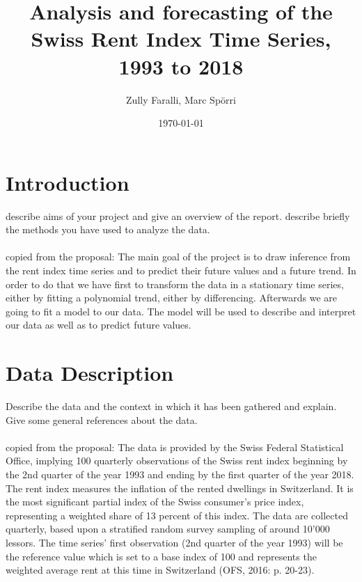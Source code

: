\documentclass[11pt,a4paper]{article}
\author{Zully Faralli, Marc Spörri} \title{Analysis and forecasting of the Swiss Rent Index Time Series, 1993 to 2018} \date{\today}
\begin{document}
\maketitle


\section{Introduction}
describe aims of your project and give an overview of the report. describe briefly the methods you have used to analyze the data.
\\
\\
copied from the proposal: The main goal of the project is to draw inference from the rent index time series and to predict their
future values and a future trend. In order to do that we have first to transform the data in a
stationary time series, either by fitting a polynomial trend, either by differencing. Afterwards we are
going to fit a model to our data. The model will be used to describe and interpret our data as well as
to predict future values.

\section{Data Description}
Describe the data and the context in which it has been gathered and explain. Give some general references about the data.
\\
\\
copied from the proposal: The data is provided by the Swiss Federal Statistical Office, implying 100 quarterly observations of
the Swiss rent index beginning by the 2nd quarter of the year 1993 and ending by the first quarter of
the year 2018. The rent index measures the inflation of the rented dwellings in Switzerland. It is the
most significant partial index of the Swiss consumer’s price index, representing a weighted share of
13 percent of this index. The data are collected quarterly, based upon a stratified random survey sampling
of around 10'000 lessors. The time series’ first observation (2nd quarter of the year 1993) will be the
reference value which is set to a base index of 100 and represents the weighted average rent at this
time in Switzerland (OFS, 2016: p. 20-23).
\end{document}
